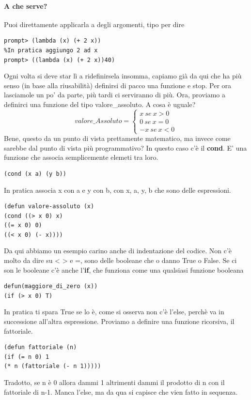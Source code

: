 \documentclass[12pt, a4paper, openany, oneside]{book}
\begin{document}
\paragraph{A che serve?} Puoi direttamente applicarla a degli argomenti, tipo 
per dire
\begin{lstlisting}[language=LISP]
prompt> (lambda (x) (+ 2 x))
%In pratica aggiungo 2 ad x
prompt> ((lambda (x) (+ 2 x))40)
\end{lstlisting}
Ogni volta si deve star lì a ridefinirsela insomma, capiamo già da qui che ha 
più senso (in base alla riusabilità) definirsi di pacco una funzione e stop.
Per ora lasciamole un po' da parte, più tardi ci serviranno di più. 
Ora, proviamo a definirci una funzione del tipo valore\_assoluto.
A cosa è uguale? 
\[
valore\_Assoluto = \begin{cases}
x ~ se ~ x > 0 \\
0 ~ se ~ x = 0 \\
-x ~ se ~ x < 0
\end{cases}
\]	
Bene, questo da un punto di vista prettamente matematico, ma invece come sarebbe
dal punto di vista più programmativo? In questo caso c'è il \textbf{cond}. 
E' una funzione che associa semplicemente elemeti tra loro.
\begin{lstlisting}[language=LISP]
(cond (x a) (y b))
\end{lstlisting}
In pratica associa x con a e y con b, con x, a, y, b che sono delle espressioni.
\begin{lstlisting}[language=LISP]
(defun valore-assoluto (x) 
(cond ((> x 0) x)
((= x 0) 0)
((< x 0) (- x))))
\end{lstlisting}
Da qui abbiamo un esempio carino anche di indentazione del codice. 
Non c'è molto da dire su < > e =, sono delle booleane che o danno True o False.
Se ci son le booleane c'è anche l'\textbf{if}, che funziona come una qualsiasi 
funzione booleana 
\begin{lstlisting}[language=LISP]
defun(maggiore_di_zero (x))
(if (> x 0) T) 
\end{lstlisting}
In pratica ti spara True se lo è, come si osserva non c'è l'else, perchè va in
successione all'altra espressione.
Proviamo a definire una funzione ricorsiva, il fattoriale.
\begin{lstlisting}[language=LISP]
(defun fattoriale (n)
(if (= n 0) 1
(* n (fattoriale (- n 1)))))
\end{lstlisting}
Tradotto, se n è 0 allora dammi 1 altrimenti dammi il prodotto di n con il 
fattoriale di n-1. Manca l'else, ma da qua si capisce che vien fatto in sequenza.
\end{document}

